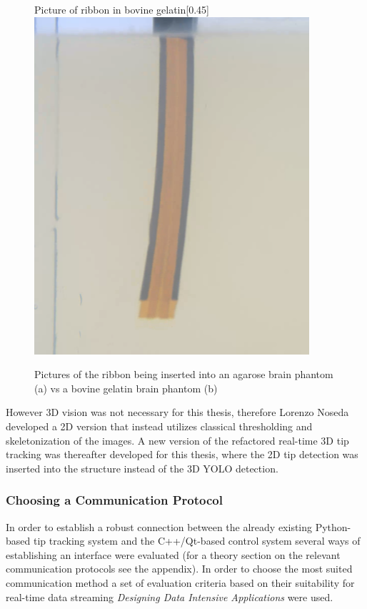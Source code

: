 \begin{figure}[htbp]
\begin{subcaptionbox}{Picture of ribbon in bovine gelatin\label{fig:right}}[0.45\linewidth]
        {\includegraphics[width=\linewidth]{images/RibbonPicture/gelatin2.PNG}}
    \end{subcaptionbox}
    \caption{Pictures of the ribbon being inserted into an agarose brain phantom (a) vs a bovine gelatin brain phantom (b)}
    \label{fig:side_by_side}
\end{figure}
However 3D vision was not necessary for this thesis, therefore Lorenzo Noseda developed a 2D version that instead utilizes classical thresholding and skeletonization of the images. A new version of the refactored real-time 3D tip tracking was thereafter developed for this thesis, where the 2D tip detection was inserted into the structure instead of the 3D YOLO detection.

\subsubsection{Choosing a Communication Protocol}
In order to establish a robust connection between the already existing Python-based tip tracking system and the C++/Qt-based control system several ways of establishing an interface were evaluated (for a theory section on the relevant communication protocols see the appendix). In order to choose the most suited communication method a set of evaluation criteria based on their suitability for real-time data streaming \textit{Designing Data Intensive Applications} \cite{kleppmann_designing_2017} were used.

